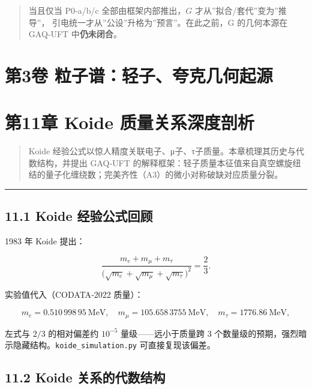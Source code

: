 \begin{quote}
当且仅当 P0‑a/b/c 全部由框架内部推出，\(G\)
才从''拟合/套代''变为''推导''，
引电统一才从''公设''升格为''预言''。在此之前，G 的几何本源在 GAQ‑UFT
中\textbf{仍未闭合}。
\end{quote}

\section{第3卷
粒子谱：轻子、夸克几何起源}\label{ux7b2c3ux5377-ux7c92ux5b50ux8c31ux8f7bux5b50ux5938ux514bux51e0ux4f55ux8d77ux6e90}

\section{第11章 Koide
质量关系深度剖析}\label{ux7b2c11ux7ae0-koide-ux8d28ux91cfux5173ux7cfbux6df1ux5ea6ux5256ux6790-1}

\begin{quote}
Koide
经验公式以惊人精度关联电子、μ子、τ子质量。本章梳理其历史与代数结构，并提出
GAQ‑UFT
的解释框架：轻子质量本征值来自真空螺旋纽结的量子化缠绕数；完美齐性（A3）的微小对称破缺对应质量分裂。
\end{quote}

\begin{center}\rule{0.5\linewidth}{0.5pt}\end{center}

\subsection{11.1 Koide
经验公式回顾}\label{koide-ux7ecfux9a8cux516cux5f0fux56deux987e}

1983 年 Koide 提出：

\[
\frac{m_e+m_\mu+m_\tau}{\bigl(\sqrt{m_e}+\sqrt{m_\mu}+\sqrt{m_\tau}\bigr)^2}=\frac{2}{3}.
\]

实验值代入（CODATA‑2022 质量）：

\[
m_e=0.510\,998\,95\ \mathrm{MeV},\quad m_\mu=105.658\,3755\ \mathrm{MeV},\quad m_\tau=1776.86\ \mathrm{MeV},
\]

左式与 \(2/3\) 的相对偏差约 \(10^{-5}\) 量级------远小于质量跨 3
个数量级的预期，强烈暗示隐藏结构。\texttt{koide\_simulation.py}
可直接复现该偏差。

\subsection{11.2 Koide
关系的代数结构}\label{koide-ux5173ux7cfbux7684ux4ee3ux6570ux7ed3ux6784}

